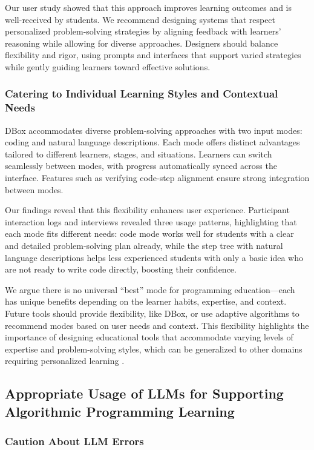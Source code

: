 {Our user study showed that this approach improves learning outcomes and is well-received by students. We recommend designing systems that respect personalized problem-solving strategies by aligning feedback with learners' reasoning while allowing for diverse approaches. Designers should balance flexibility and rigor, using prompts and interfaces that support varied strategies while gently guiding learners toward effective solutions.


\subsubsection{\textbf{Catering to Individual Learning Styles and Contextual Needs}}

DBox accommodates diverse problem-solving approaches with two input modes: coding and natural language descriptions. Each mode offers distinct advantages tailored to different learners, stages, and situations. Learners can switch seamlessly between modes, with progress automatically synced across the interface. Features such as verifying code-step alignment ensure strong integration between modes.

Our findings reveal that this flexibility enhances user experience. Participant interaction logs and interviews revealed three usage patterns, highlighting that each mode fits different needs: code mode works well for students with a clear and detailed problem-solving plan already, while the step tree with natural language descriptions helps less experienced students with only a basic idea who are not ready to write code directly, boosting their confidence.


We argue there is no universal “best” mode for programming education—each has unique benefits depending on the learner habits, expertise, and context. Future tools should provide flexibility, like DBox, or use adaptive algorithms to recommend modes based on user needs and context. This flexibility highlights the importance of designing educational tools that accommodate varying levels of expertise and problem-solving styles, which can be generalized to other domains requiring personalized learning \cite{bernacki2021systematic}.

\subsection{Appropriate Usage of LLMs for Supporting Algorithmic Programming Learning}

\subsubsection{\textbf{Caution About LLM Errors}}

}
